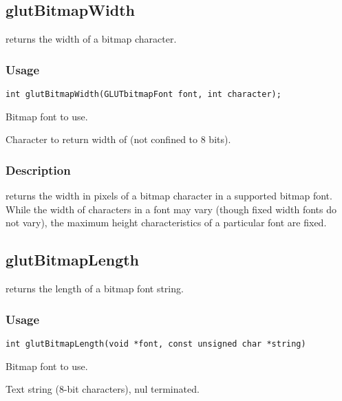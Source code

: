 \subsection{glutBitmapWidth}

 returns the width of a bitmap character.

\subsubsection*{Usage}
\begin{verbatim}
int glutBitmapWidth(GLUTbitmapFont font, int character);
\end{verbatim}
\begin{description}
\itemsep 0in
\item[{\tt font}]
Bitmap font to use.
\item[{\tt character}]
Character to return width of (not confined to 8 bits).
\end{description}

\subsubsection*{Description}

 returns the width in pixels of a bitmap character
in a supported bitmap font.  While the width of characters in a font
may vary (though fixed width fonts do not vary), the maximum height
characteristics of a particular font are fixed.

\subsection{glutBitmapLength}

 returns the length of a bitmap font string.

\subsubsection*{Usage}
\begin{verbatim}
int glutBitmapLength(void *font, const unsigned char *string)
\end{verbatim}
\begin{description}
\itemsep 0in
\item[{\tt font}]
Bitmap font to use.
\item[{\tt string}]
Text string (8-bit characters), nul terminated.
\end{description}

